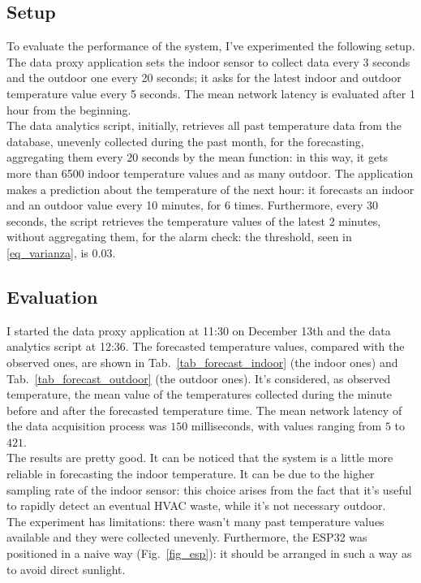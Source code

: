 \documentclass[conference]{IEEEtran}
\begin{document}
\subsection{Setup}
To evaluate the performance of the system, I've experimented the following setup.\\
The data proxy application sets the indoor sensor to collect data every 3 seconds and the outdoor one every 20 seconds; it asks for the latest indoor and outdoor temperature value every 5 seconds. The mean network latency is evaluated after 1 hour from the beginning.\\
The data analytics script, initially, retrieves all past temperature data from the database, unevenly collected during the past month, for the forecasting, aggregating them every 20 seconds by the mean function: in this way, it gets more than 6500 indoor temperature values and as many outdoor. The application makes a prediction about the temperature of the next hour: it forecasts an indoor and an outdoor value every 10 minutes, for 6 times. Furthermore, every 30 seconds, the script retrieves the temperature values of the latest 2 minutes, without aggregating them, for the alarm check: the threshold, seen in \eqref{eq_varianza}, is $0.03$.

\subsection{Evaluation}
I started the data proxy application at 11:30 on December 13th and the data analytics script at 12:36. The forecasted temperature values, compared with the observed ones, are shown in Tab.~\ref{tab_forecast_indoor} (the indoor ones) and Tab.~\ref{tab_forecast_outdoor} (the outdoor ones). It's considered, as observed temperature, the mean value  of the temperatures collected during the minute before and after the forecasted temperature time. The mean network latency of the data acquisition process was $150$ milliseconds, with values ranging from $5$ to $421$.\\
The results are pretty good. It can be noticed that the system is a little more reliable in forecasting the indoor temperature. It can be due to the higher sampling rate of the indoor sensor: this choice arises from the fact that it's useful to rapidly detect an eventual HVAC waste, while it's not necessary outdoor.\\
The experiment has limitations: there wasn't many past temperature values available and they were collected unevenly. Furthermore, the ESP32 was positioned in a naive way (Fig.~\ref{fig_esp}): it should be arranged in such a way as to avoid direct sunlight.
\end{document}
